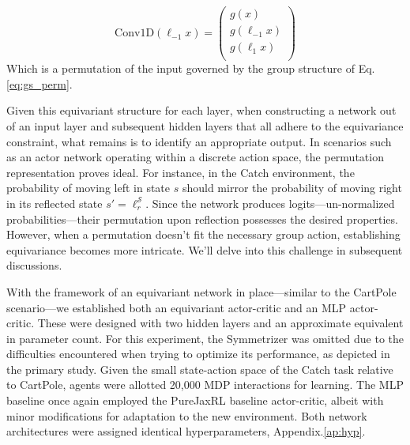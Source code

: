 \begin{equation}
	\text{Conv1D}(\ell_{-1} x) = \begin{pmatrix}
		g(x)          \\
		g(\ell_{-1}x) \\
		g(\ell_{1}x)  \\
	\end{pmatrix}
\end{equation}
Which is a permutation of the input governed by the group structure of Eq.\ref{eq:gs_perm}.

Given this equivariant structure for each layer, when constructing a network out of an input layer and subsequent hidden layers that all adhere to the equivariance constraint, what remains is to identify an appropriate output. In scenarios such as an actor network operating within a discrete action space, the permutation representation proves ideal. For instance, in the Catch environment, the probability of moving left in state \( s \) should mirror the probability of moving right in its reflected state \( s' = \ell_r^\mathcal{S} \). Since the network produces logits—un-normalized probabilities—their permutation upon reflection possesses the desired properties. However, when a permutation doesn't fit the necessary group action, establishing equivariance becomes more intricate. We'll delve into this challenge in subsequent discussions.

With the framework of an equivariant network in place—similar to the CartPole scenario—we established both an equivariant actor-critic and an MLP actor-critic. These were designed with two hidden layers and an approximate equivalent in parameter count. For this experiment, the Symmetrizer was omitted due to the difficulties encountered when trying to optimize its performance, as depicted in the primary study. Given the small state-action space of the Catch task relative to CartPole, agents were allotted 20,000 MDP interactions for learning. The MLP baseline once again employed the PureJaxRL baseline actor-critic, albeit with minor modifications for adaptation to the new environment. Both network architectures were assigned identical hyperparameters, Appendix.\ref{ap:hyp}.

